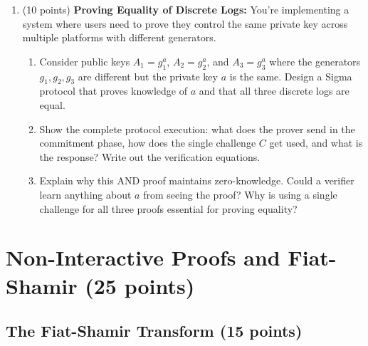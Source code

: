 \documentclass[10pt,a4paper,american]{exam}
\begin{document}
\begin{enumerate}
	\item (10 points) \textbf{Proving Equality of Discrete Logs:}
	      You're implementing a system where users need to prove they control the same private key across multiple platforms with different generators.
	      \begin{enumerate}
		      \item Consider public keys $A_1 = g_1^a$, $A_2 = g_2^a$, and $A_3 = g_3^a$ where the generators $g_1, g_2, g_3$ are different but the private key $a$ is the same. Design a Sigma protocol that proves knowledge of $a$ and that all three discrete logs are equal.
		      \item Show the complete protocol execution: what does the prover send in the commitment phase, how does the single challenge $C$ get used, and what is the response? Write out the verification equations.
		      \item Explain why this AND proof maintains zero-knowledge. Could a verifier learn anything about $a$ from seeing the proof? Why is using a single challenge for all three proofs essential for proving equality?
	      \end{enumerate}
\end{enumerate}

\section{Non-Interactive Proofs and Fiat-Shamir (25 points)}

\subsection{The Fiat-Shamir Transform (15 points)}
\end{document}
